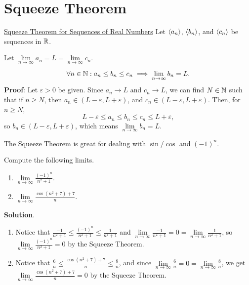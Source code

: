 \section{Squeeze Theorem}
\begin{Theorem}{\href{https://proofwiki.org/wiki/Squeeze_Theorem\#Sequences\_of\_Real\_Numbers}{Squeeze Theorem for Sequences of Real Numbers}}{}
    Let $ \langle a_n\rangle $, $ \langle b_n\rangle $, and $ \langle c_n\rangle $
    be sequences in $ \mathbb{R} $.\smallskip

    Let $ \lim\limits_{{n} \to {\infty}}a_n=L=\lim\limits_{{n} \to {\infty}}c_n $.\smallskip

    \[ \forall n\in\mathbb{N}:a_n\le b_n\le c_n \implies \lim\limits_{{n} \to {\infty}}b_n=L. \]
    \tcblower{}
    \textbf{Proof}: Let $ \varepsilon>0 $ be given.
    Since $ a_n\to L $ and $ c_n\to L $, we can find $ N\in\mathbb{N} $
    such that if $ n\ge N $, then $ a_n\in(L-\varepsilon,L+\varepsilon) $,
    and $ c_n\in(L-\varepsilon,L+\varepsilon) $. Then, for $ n\ge N $,
    \[ L-\varepsilon\le a_n\le b_n\le c_n\le L+\varepsilon, \]
    so $ b_n\in (L-\varepsilon,L+\varepsilon) $, which means
    $ \lim\limits_{{n} \to {\infty}}b_n=L $.
\end{Theorem}
\begin{Remark}{}{}
    The Squeeze Theorem is great for dealing with $ \sin/\cos $
    and $ (-1)^n $.
\end{Remark}
\begin{Example}{}{}
    Compute the following limits.
    \begin{enumerate}[(1)]
        \item $ \lim\limits_{{n} \to {\infty}}\frac{(-1)^n}{n^2+1} $.
        \item $ \lim\limits_{{n} \to {\infty}}\frac{\cos(n^2+7)+7}{n} $.
    \end{enumerate}
    \tcblower{}
    \textbf{Solution}.
    \begin{enumerate}[(1)]
        \item Notice that $ \frac{-1}{n^2+1}\le \frac{(-1)^n}{n^2+1}\le \frac{1}{n^2+1} $
              and $ \lim\limits_{{n} \to {\infty}}\frac{-1}{n^2+1}=0=\lim\limits_{{n} \to {\infty}}\frac{1}{n^2+1} $,
              so $ \lim\limits_{{n} \to {\infty}}\frac{(-1)^n}{n^2+1}=0 $ by the Squeeze Theorem.
        \item Notice that $ \frac{6}{n}\le \frac{\cos(n^2+7)+7}{n}\le \frac{8}{n} $,
              and since $ \lim\limits_{{n} \to {\infty}}\frac{6}{n}=0=\lim\limits_{{n} \to {\infty}}\frac{8}{n} $,
              we get $ \lim\limits_{{n} \to {\infty}}\frac{\cos(n^2+7)+7}{n}=0 $ by the Squeeze Theorem.
    \end{enumerate}
\end{Example}

